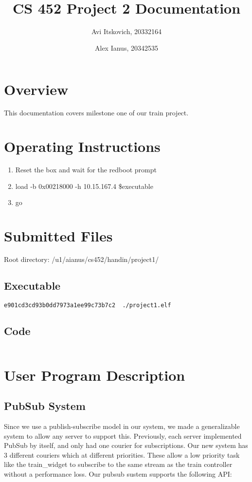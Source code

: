 \documentclass{article}
\title{CS 452 Project 2 Documentation}
\author{
  Avi Itskovich, 20332164
  \and
  Alex Ianus, 20342535
}
\begin{document}
\maketitle

\section{Overview}

This documentation covers milestone one of our train project.

\section{Operating Instructions}
\begin{enumerate}
  \item Reset the box and wait for the redboot prompt
  \item load -b 0x00218000 -h 10.15.167.4 \$executable
  \item go
\end{enumerate}

\section{Submitted Files}
Root directory: /u1/aianus/cs452/handin/project1/

\subsection{Executable}
\begin{verbatim}
e901cd3cd93b0dd7973a1ee99c73b7c2  ./project1.elf
\end{verbatim}

\subsection{Code}
\begin{verbatim}
\end{verbatim}

\section{User Program Description}

\subsection{PubSub System}

Since we use a publish-subscribe model in our system, we made a generalizable system to allow any server to support this. Previously, each server implemented PubSub by itself, and only had one courier for subscriptions. Our new system has 3 different couriers which at different priorities. These allow a low priority task like the train\_widget to subscribe to the same stream as the train controller without a performance loss. Our pubsub sustem supports the following API:
\end{document}
